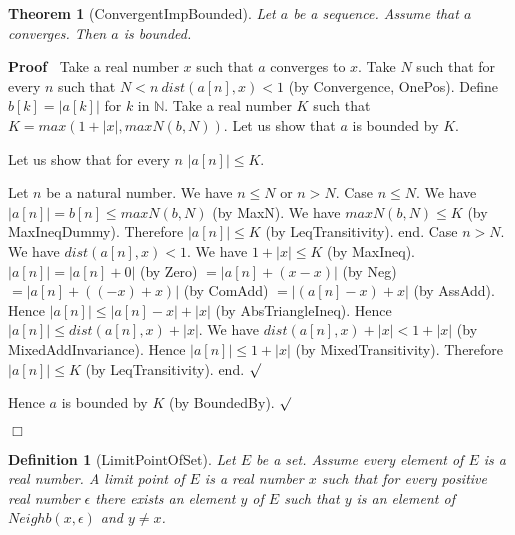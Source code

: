 \documentclass{article}
\newenvironment{forthel}{\begin{leftbar}}{\end{leftbar}}
\newenvironment{proof}{\noindent\textbf{Proof\ }}{\hspace*{\fill}$\Box$\medskip}
\newenvironment{subproof}{\begin{list}{}{}
		\item[\text{Proof}]}{\hfill $\surd$ \end{list}}
\newtheorem{theorem}{Theorem}
\newtheorem{definition}{Definition}
\newcommand{\NN}{\mathbb{N}}
\newcommand{\dotequal}{=}
\newcommand{\abs}[1]{|{#1}|}
\begin{document}
\begin{forthel}
	\begin{theorem}[ConvergentImpBounded]
	Let $a$ be a sequence. Assume that $a$ converges. Then $a$ is bounded.
	\end{theorem}
	\begin{proof}
	Take a real number $x$ such that $a$ converges to $x$.
	Take $N$ such that for every $n$ such that $N < n \ dist(a[n],x) < 1$ (by Convergence, OnePos).
	Define $b[k] = \abs{a[k]}$ for $k$ in $\NN$.
	Take a real number $K$ such that $K = max(1 + \abs{x}, maxN(b,N))$.
	Let us show that $a$ is bounded by $K$.
	\begin{subproof}
	Let us show that for every $n$ $\abs{a[n]} \leq K$.
	\begin{subproof} 
	Let $n$ be a natural number.
	We have $n \leq N$ or $n > N$.
	Case $n \leq N$.
	We have $\abs{a[n]} = b[n] \leq maxN(b,N)$ (by MaxN).
	We have $maxN(b,N) \leq K$ (by MaxIneqDummy).
	Therefore $\abs{a[n]} \leq K$ (by LeqTransitivity).
	end.
	Case $n > N$.
	We have $dist(a[n],x) < 1$.
	We have $1 + \abs{x} \leq K$ (by MaxIneq).
	$\abs{a[n]} \dotequal \abs{a[n] + 0}$ (by Zero)
	$\dotequal \abs{a[n] + (x - x)}$ (by Neg)
	$\dotequal \abs{a[n] + ((-x) + x)}$ (by ComAdd)
	$\dotequal \abs{(a[n] - x) + x}$ (by AssAdd).
	Hence $\abs{a[n]} \leq \abs{a[n] - x} + \abs{x}$ (by AbsTriangleIneq).
	Hence $\abs{a[n]} \leq dist(a[n],x) + \abs{x}$.
	We have $dist(a[n],x) + \abs{x} < 1 + \abs{x}$ (by MixedAddInvariance).
	Hence $\abs{a[n]} \leq 1 + \abs{x}$ (by MixedTransitivity).
	Therefore $\abs{a[n]} \leq K$ (by LeqTransitivity).
	end.
	\end{subproof}
	Hence $a$ is bounded by $K$ (by BoundedBy).
	\end{subproof}
	\end{proof}
	
	\begin{definition}[LimitPointOfSet]
	Let $E$ be a set. Assume every element of $E$ is a real number. A limit point of $E$
	is a real number $x$ such that for every positive real number $\epsilon$ there exists an element
	$y$ of $E$ such that $y$ is an element of $Neighb(x,\epsilon)$ and $y \neq x$.
	\end{definition}
	

\end{forthel}
\end{document}
